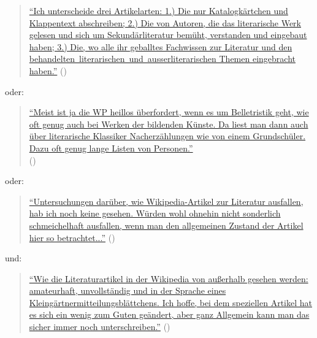 \documentclass[fontsize=12pt]{scrartcl}
\begin{document}
\singlespacing
\begin{quote}
\href{https://de.wikipedia.org/w/index.php?title=Benutzer_Diskussion:Grillenwaage\&diff=137653987\&oldid=137652648}{"`Ich unterscheide drei Artikelarten: 1.) Die nur Katalogk\"artchen und Klappentext abschrei\-ben; 2.) Die von Autoren, die das li\-te\-ra\-rische Werk gelesen und sich um Sekund\"arli\-te\-ra\-tur\- bem\"uht, verstanden und eingebaut haben; 3.) Die, wo alle ihr geballtes Fachwissen zur Li\-te\-ra\-tur und den be\-han\-del\-ten \,li\-te\-ra\-rischen \,und \,ausserli\-te\-ra\-ri\-schen The\-men ein\-ge\-bracht ha\-ben."'} (\cite{UserEmeritus2015})
\end{quote}
\onehalfspacing

oder: 

\singlespacing
\begin{quote}
\href{https://de.wikipedia.org/w/index.php?title=Wikipedia_Diskussion:Hauptseite\&diff=prev\&oldid=136449008}{"`Meist ist ja die WP heillos \"uberfordert, wenn es um Belletristik geht, wie oft genug auch bei Werken der bildenden K\"unste. Da liest man dann auch \"uber li\-te\-ra\-rische Klassiker Nacherz\"ahlungen wie von einem Grundsch\"uler. Dazu oft genug lange Listen von Per\-so\-nen."'}\\ (\cite{UserHummelhum2014})
\end{quote}
\onehalfspacing

oder:

\singlespacing
\begin{quote}
\href{https://de.wikipedia.org/w/index.php?title=Benutzer_Diskussion:Edith_Wahr\&diff=138421804\&oldid=138421510}{"`Untersuchungen dar\"uber, wie Wi\-ki\-pe\-dia-Artikel zur Li\-te\-ra\-tur ausfallen, hab ich noch keine gesehen. W\"urden wohl ohnehin nicht sonderlich schmeichelhaft ausfallen, wenn man den allgemeinen Zustand der Artikel \mbox{hier} so betrachtet..."'} (\cite{UserEdithWahr2015a})
\end{quote}
\onehalfspacing

und: 

\singlespacing
\begin{quote}
\href{https://de.wikipedia.org/w/index.php?title=Benutzer_Diskussion:Edith_Wahr\&diff=prev\&oldid=138424233}{"`Wie die Li\-te\-ra\-tur\-artikel in der Wi\-ki\-pe\-dia von au{\ss}erhalb gesehen werden: amateurhaft, unvollst\"andig und in der Sprache eines Kleing\"art\-ner\-mit\-tei\-lungs\-bl\"att\-chens. Ich hoffe, bei dem speziellen Artikel hat es sich ein wenig zum Guten ge\"andert, aber ganz Allgemein kann man das sicher immer noch unterschrei\-ben."'} (\cite{UserMagiers2015b})
\end{quote}
\onehalfspacing
\end{document}
